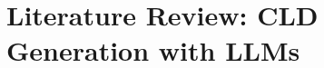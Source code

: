\documentclass[11pt,a4paper]{article}
\begin{document}
\section{Literature Review: CLD Generation with LLMs}





\end{document}

